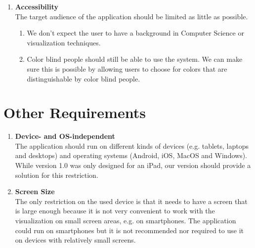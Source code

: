 \begin{enumerate}[label=\textbf{\arabic*}., ref=\arabic*]
	\item \textbf{Accessibility\label{item:accessibility}} \hfill \\
	The target audience of the application should be limited as little as possible. 
	\begin{enumerate}
		\item We don't expect the user to have a background in Computer Science or visualization techniques. 
		\item Color blind people should still be able to use the system. We can make sure this is possible by allowing users to choose for colors that are distinguishable by color blind people.
	\end{enumerate}
	
\end{enumerate}



\section{Other Requirements}\label{sec:other-requirements}

\begin{enumerate}[label=\textbf{\arabic*}., ref=\arabic*]
	\item \textbf{Device- and OS-independent\label{item:device-os-independent}} \hfill \\
	The application should run on different kinds of devices (e.g. tablets, laptops and desktops) and operating systems (Android, iOS, MacOS and Windows). While version 1.0 was only designed for an iPad, our version should provide a solution for this restriction. 
	
	\item \textbf{Screen Size\label{item:screen-size}} \hfill \\
	The only restriction on the used device is that it needs to have a screen that is large enough because it is not very convenient to work with the visualization on small screen areas, e.g. on smartphones. The application could run on smartphones but it is not recommended nor required to use it on devices with relatively small screens.

\end{enumerate}
